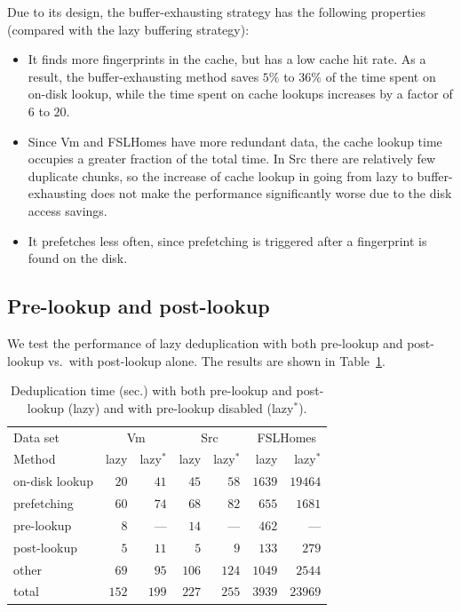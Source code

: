 \documentclass[prodmode,acmtecs]{acmsmall}
\begin{document}
Due to its design, the buffer-exhausting strategy has the following properties (compared with the lazy buffering strategy):
\begin{itemize}
 \item It finds more fingerprints in the cache, but has a low cache hit rate.  As a result, the buffer-exhausting method saves $5\%$ to $36\%$ of the time spent on on-disk lookup, while the time spent on cache lookups increases by a factor of $6$ to $20$.
 
 \item Since Vm and FSLHomes have more redundant data, the cache lookup time occupies a greater fraction of the total time.  In Src there are relatively few duplicate chunks, so the increase of cache lookup in going from lazy to buffer-exhausting does not make the performance significantly worse due to the disk access savings.

 \item It prefetches less often, since prefetching is triggered after a fingerprint is found on the disk.
\end{itemize}

\subsection{Pre-lookup and post-lookup}

We test the performance of lazy deduplication with both pre-lookup and post-lookup vs.\ with post-lookup alone.  The results are shown in Table~\ref{tab:two-stage-result}.

\begin{table}[htp]
\centering
\begin{tabular}{lrrrrrr}
\toprule
Data set & \multicolumn{2}{c}{Vm} & \multicolumn{2}{c}{Src} & \multicolumn{2}{c}{FSLHomes} \\
\cmidrule(lr){2-3} \cmidrule(lr){4-5} \cmidrule(lr){6-7}
Method & lazy & lazy$^*$ & lazy & lazy$^*$ & lazy & lazy$^*$ \\
\midrule
on-disk lookup & $20$ & $41$ & $45$ & $58$ & $1639$ & $19464$ \\
prefetching & $60$ & $74$ & $68$ & $82$ & $655$ & $1681$ \\
pre-lookup & $8$ & --- & $14$ & --- & $462$ & ---\\
post-lookup & $5$ & $11$ & $5$ & $9$ & $133$ & $279$ \\
other & $69$ & $95$ & $106$ & $124$ & $1049$ & $2544$ \\
\midrule
total & $152$ & $199$ & $227$ & $255$ & $3939$ & $23969$ \\
\bottomrule
\end{tabular}
\caption{Deduplication time (sec.) with both pre-lookup and post-lookup (lazy) and with pre-lookup disabled (lazy$^*$).}
\label{tab:two-stage-result}
\end{table}
\end{document}
